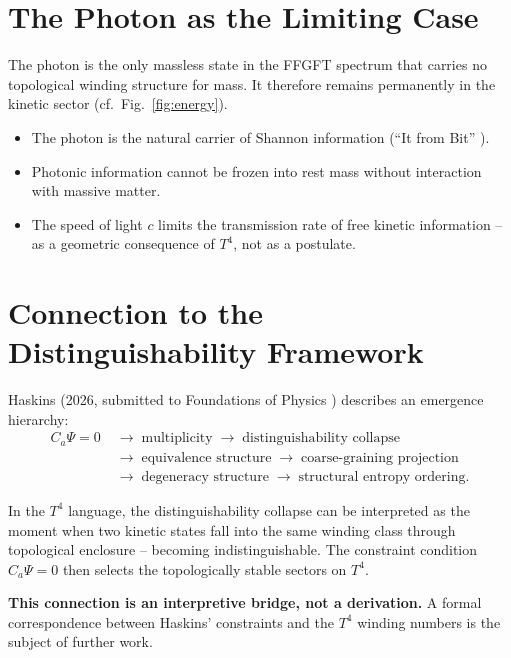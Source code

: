 \section{The Photon as the Limiting Case}

The photon is the only massless state in the FFGFT spectrum that
carries no topological winding structure for mass.
It therefore remains permanently in the kinetic sector
(cf.\ Fig.~\ref{fig:energy}).

\begin{itemize}
  \item The photon is the natural carrier of Shannon information
        (\enquote{It from Bit} \cite{Wheeler1990}).
  \item Photonic information cannot be frozen into rest mass
        without interaction with massive matter.
  \item The speed of light \(c\) limits the transmission rate
        of free kinetic information -- as a geometric consequence
        of \(T^4\), not as a postulate.
\end{itemize}

\section{Connection to the Distinguishability Framework}

Haskins (2026, submitted to Foundations of Physics \cite{Haskins2026})
describes an emergence hierarchy:
\begin{align*}
C_a\Psi = 0 \;&\to\; \text{multiplicity} \;\to\;
\text{distinguishability collapse} \\
&\to\; \text{equivalence structure} \;\to\;
\text{coarse-graining projection} \\
&\to\; \text{degeneracy structure} \;\to\;
\text{structural entropy ordering.}
\end{align*}

In the \(T^4\) language, the distinguishability collapse can be
interpreted as the moment when two kinetic states fall into the
same winding class through topological enclosure -- becoming
indistinguishable. The constraint condition \(C_a\Psi = 0\) then
selects the topologically stable sectors on \(T^4\).

\textbf{This connection is an interpretive bridge, not a derivation.}
A formal correspondence between Haskins' constraints and the
\(T^4\) winding numbers is the subject of further work.

